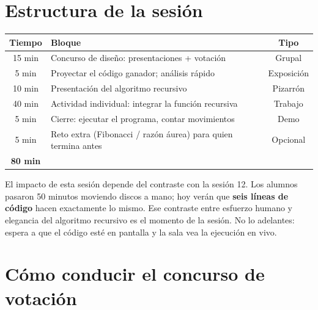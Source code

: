\documentclass[12pt, oneside]{article}
\begin{document}

\tableofcontents
\newpage

\section{Estructura de la sesión}

\begin{center}
\begin{tabular}{clc}
  \toprule
  \textbf{Tiempo} & \textbf{Bloque} & \textbf{Tipo} \\
  \midrule
  15 min & Concurso de diseño: presentaciones + votación & Grupal \\
   5 min & Proyectar el código ganador; análisis rápido & Exposición \\
  10 min & Presentación del algoritmo recursivo & Pizarrón \\
  40 min & Actividad individual: integrar la función recursiva & Trabajo \\
   5 min & Cierre: ejecutar el programa, contar movimientos & Demo \\
   5 min & Reto extra (Fibonacci / razón áurea) para quien termina antes & Opcional \\
  \midrule
  \textbf{80 min} & & \\
  \bottomrule
\end{tabular}
\end{center}

\begin{notaprofesor}
  El impacto de esta sesión depende del contraste con la sesión 12.
  Los alumnos pasaron 50 minutos moviendo discos a mano; hoy verán que
  \textbf{seis líneas de código} hacen exactamente lo mismo.  Ese
  contraste entre esfuerzo humano y elegancia del algoritmo recursivo
  es el momento de la sesión.  No lo adelantes: espera a que el código
  esté en pantalla y la sala vea la ejecución en vivo.
\end{notaprofesor}

\section{Cómo conducir el concurso de votación}
\end{document}
